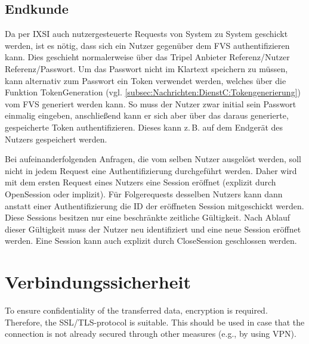 \subsection*{Endkunde}
Da per IXSI auch nutzergesteuerte Requests von System zu System geschickt werden, ist
es nötig, dass sich ein Nutzer gegenüber dem FVS authentifizieren kann.
Dies geschieht normalerweise über das Tripel Anbieter Referenz/Nutzer Referenz/Passwort. Um das  Passwort nicht im Klartext speichern zu müssen, kann alternativ zum Passwort ein Token
verwendet werden, welches über die Funktion TokenGeneration (vgl. \cref{subsec:Nachrichten:DienstC:Tokengenerierung}) vom FVS
generiert werden kann. So muss der Nutzer zwar initial sein Passwort einmalig eingeben, anschließend kann er sich aber über das daraus generierte, gespeicherte Token authentifizieren. Dieses kann z.\,B. auf dem Endgerät des Nutzers gespeichert werden.

Bei aufeinanderfolgenden Anfragen, die vom selben Nutzer ausgelöst werden, soll nicht in jedem Request eine Authentifizierung durchgeführt werden. Daher wird mit dem ersten Request eines Nutzers eine Session eröffnet (explizit durch OpenSession oder implizit). Für Folgerequests desselben Nutzers kann dann anstatt einer Authentifizierung die ID der eröffneten Session mitgeschickt werden. Diese Sessions besitzen nur eine beschränkte zeitliche Gültigkeit. Nach Ablauf dieser Gültigkeit muss der Nutzer neu identifiziert und eine neue Session eröffnet werden. Eine Session kann auch explizit durch CloseSession geschlossen werden.

\section{Verbindungssicherheit}
To ensure confidentiality of the transferred data, encryption is required. Therefore, the SSL/TLS-protocol is suitable. This should be used in case that the connection is not already secured through other measures (e.g., by using VPN).
